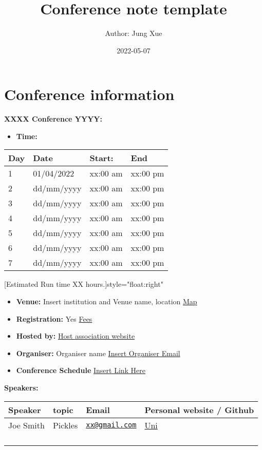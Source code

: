 \documentclass[
]{book}
\title{Conference note template}
\author{Author: Jung Xue}
\date{2022-05-07}
\providecommand{\tightlist}{%
  \setlength{\itemsep}{0pt}\setlength{\parskip}{0pt}}
\begin{document}
\maketitle

{
\setcounter{tocdepth}{1}
\tableofcontents
}
\hypertarget{conference-information}{%
\chapter*{Conference information}\label{conference-information}}

\textbf{XXXX Conference YYYY:}

\begin{itemize}
\tightlist
\item
  \textbf{Time:}
\end{itemize}

\begin{longtable}[]{@{}llll@{}}
\toprule
Day & Date & Start: & End\tabularnewline
\midrule
\endhead
1 & 01/04/2022 & xx:00 am & xx:00 pm\tabularnewline
2 & dd/mm/yyyy & xx:00 am & xx:00 pm\tabularnewline
3 & dd/mm/yyyy & xx:00 am & xx:00 pm\tabularnewline
4 & dd/mm/yyyy & xx:00 am & xx:00 pm\tabularnewline
5 & dd/mm/yyyy & xx:00 am & xx:00 pm\tabularnewline
6 & dd/mm/yyyy & xx:00 am & xx:00 pm\tabularnewline
7 & dd/mm/yyyy & xx:00 am & xx:00 pm\tabularnewline
\bottomrule
\end{longtable}

\hfill[Estimated Run time XX hours.]{style="float:right"}

\begin{itemize}
\tightlist
\item
  \textbf{Venue:} Insert institution and Venue name, location \href{}{Map}
\item
  \textbf{Registration:} Yes \href{}{Fees}
\item
  \textbf{Hosted by:} \href{}{Host association website}
\item
  \textbf{Organiser:} Organiser name \href{}{Insert Organiser Email}
\item
  \textbf{Conference Schedule} \href{}{Insert Link Here}
\end{itemize}

\textbf{Speakers:}

\begin{longtable}[]{@{}llll@{}}
\toprule
Speaker & topic & Email & Personal website / Github\tabularnewline
\midrule
\endhead
Joe Smith & Pickles & \href{mailto:xx@gmail.com}{\nolinkurl{xx@gmail.com}} & \href{www.google.com}{Uni}\tabularnewline
& & &\tabularnewline
& & &\tabularnewline
& & &\tabularnewline
& & &\tabularnewline
\bottomrule
\end{longtable}
\end{document}
